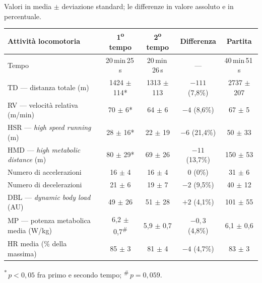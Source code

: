 Valori in media $\pm$ deviazione standard; le differenze in valore assoluto e in percentuale.

\begin{center}
\footnotesize
\begin{tabular}{|l|c|c|c|c|}
\hline
\textbf{Attività locomotoria} & \textbf{1\textsuperscript{o} tempo} & \textbf{2\textsuperscript{o} tempo} & \textbf{Differenza} & \textbf{Partita} \\
\hline
Tempo                        & 20\,min\,25\,s & 20\,min\,26\,s & ---          & 40\,min\,51\,s \\
TD --- distanza totale (m)   & 1424 $\pm$ 114* & 1313 $\pm$ 113 & $-111$ (7,8\%)  & 2737 $\pm$ 207 \\
RV --- velocità relativa (m/min) & 70 $\pm$ 6* & 64 $\pm$ 6     & $-4$ (8,6\%)    & 67 $\pm$ 5 \\
HSR --- \textit{high speed running} (m) & 28 $\pm$ 16* & 22 $\pm$ 19 & $-6$ (21,4\%) & 50 $\pm$ 33 \\
HMD --- \textit{high metabolic distance} (m) & 80 $\pm$ 29* & 69 $\pm$ 26 & $-11$ (13,7\%) & 150 $\pm$ 53 \\
Numero di accelerazioni      & 16 $\pm$ 4      & 16 $\pm$ 4     & 0 (0\%)         & 31 $\pm$ 6 \\
Numero di decelerazioni      & 21 $\pm$ 6      & 19 $\pm$ 7     & $-2$ (9,5\%)    & 40 $\pm$ 12 \\
DBL --- \textit{dynamic body load} (AU) & 49 $\pm$ 26 & 51 $\pm$ 28 & $+2$ (4,1\%) & 101 $\pm$ 55 \\
MP --- potenza metabolica media (W/kg) & 6,2 $\pm$ 0,7\textsuperscript{\#} & 5,9 $\pm$ 0,7 & $-0,3$ (4,8\%) & 6,1 $\pm$ 0,6 \\
HR media (\% della massima)  & 85 $\pm$ 3      & 81 $\pm$ 4     & $-4$ (4,7\%)    & 83 $\pm$ 3 \\
\hline
\end{tabular}
\end{center}
\footnotesize \textsuperscript{*}\,$p < 0{,}05$ fra primo e secondo tempo;
\textsuperscript{\#}\,$p = 0{,}059$.
\normalsize

